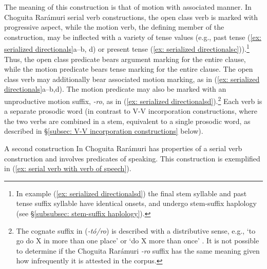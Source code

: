 \largerpage
The meaning of this construction is that of motion with associated manner. In Choguita Rarámuri serial verb constructions, the open class verb is marked with progressive aspect, while the motion verb, the defining member of the construction, may be inflected with a variety of tense values (e.g., past tense (\ref{ex: serialized directionals}a--b, d) or present tense (\ref{ex: serialized directionalsc})).\footnote{In example (\ref{ex: serialized directionalsd}) the final stem syllable and past tense suffix syllable have identical onsets, and undergo stem-suffix haplology (see §\ref{subsubsec: stem-suffix haplology}).} Thus, the open class predicate bears argument marking for the entire clause, while the motion predicate bears tense marking for the entire clause. The open class verb may additionally bear associated motion marking, as in (\ref{ex: serialized directionals}a--b,d). The motion predicate may also be marked with an unproductive motion suffix, \textit{-ro}, as in (\ref{ex: serialized directionalsd}).\footnote{The cognate suffix in  (\textit{-tó/ro}) is described with a distributive sense, e.g., `to go do X in more than one place' or `do X more than once' \citep[165]{miller1996guarijio}. It is not possible to determine if the Choguita Rarámuri \textit{-ro} suffix has the same meaning given how infrequently it is attested in the corpus.} Each verb is a separate prosodic word (in contrast to V-V incorporation constructions, where the two verbs are combined in a stem, equivalent to a single prosodic word, as described in §\ref{subsec: V-V incorporation constructions} below).

A second construction In Choguita Rarámuri has properties of a serial verb construction and involves predicates of speaking. This construction is exemplified in (\ref{ex: serial verb with verb of speech}).

\ea\label{ex: serial verb with verb of speech}

    \label{ex: serial verb with verb of speecha}

